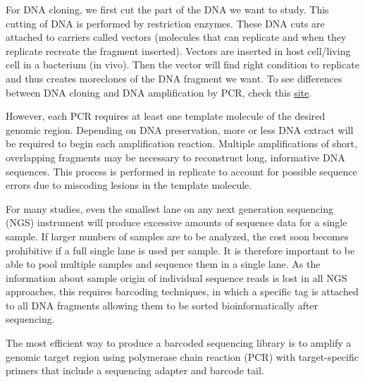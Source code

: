 \documentclass[]{article}
\begin{document}
For DNA cloning, we first cut the part of the DNA we want to study. This
cutting of DNA is performed by restriction enzymes. These DNA cuts are
attached to carriers called vectors (molecules that can replicate and
when they replicate recreate the fragment inserted). Vectors are
inserted in host cell/living cell in a bacterium (in vivo). Then the
vector will find right condition to replicate and thus creates
moreclones of the DNA fragment we want. To see differences between DNA
cloning and DNA amplification by PCR, check this
\href{http://www.majordifferences.com/2013/10/difference-between-gene-cloning-and-pcr.html\#.VqmE4ZMrL-Y}{site}.

However, each PCR requires at least one template molecule of the desired
genomic region. Depending on DNA preservation, more or less DNA extract
will be required to begin each amplification reaction. Multiple
amplifications of short, overlapping fragments may be necessary to
reconstruct long, informative DNA sequences. This process is performed
in replicate to account for possible sequence errors due to miscoding
lesions in the template molecule.

For many studies, even the smallest lane on any next generation
sequencing (NGS) instrument will produce excessive amounts of sequence
data for a single sample. If larger numbers of samples are to be
analyzed, the cost soon becomes prohibitive if a full single lane is
used per sample. It is therefore important to be able to pool multiple
samples and sequence them in a single lane. As the information about
sample origin of individual sequence reads is lost in all NGS
approaches, this requires barcoding techniques, in which a specific tag
is attached to all DNA fragments allowing them to be sorted
bioinformatically after sequencing.

The most efficient way to produce a barcoded sequencing library is to
amplify a genomic target region using polymerase chain reaction (PCR)
with target-specific primers that include a sequencing adapter and
barcode tail.
\end{document}
